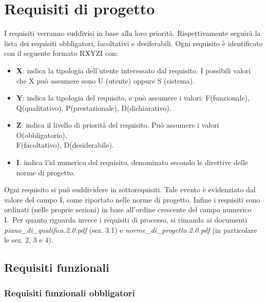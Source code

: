 \newpage\section{Requisiti di progetto}
I requisiti verranno suddivisi in base alla loro priorità. Rispettivamente seguirà la lista dei requisiti obbligatori, facoltativi e desiferabili. Ogni requisito è identificato con il seguente formato RXYZI con:


		\begin{itemize}

			\item \textbf{X}: indica la tipologia dell'utente interessato dal requisito. I possibili valori che X può assumere sono U (utente) oppure S (sistema).

			\item \textbf{Y}: indica la tipologia del requisito, e può assumere i valori: F(funzionale), Q(qualitativo), P(prestazionale), D(dichiarativo).

			\item \textbf{Z}: indica il livello di priorità del requisito. Può assumere i valori O(obbligatorio), \\F(facoltativo), D(desiderabile).

			\item \textbf{I}: indica l'id numerico del requisito, denominato secondo le direttive delle norme di progetto.

		\end{itemize}


		Ogni requisito si può suddividere in sottorequisiti. Tale evento è evidenziato dal valore del campo I, come riportato nelle norme di progetto. Infine i requisiti sono ordinati (nelle proprie sezioni) in base all'ordine crescente del campo numerico I.\
Per quanto riguarda invece i requisiti di processo, si rimanda ai documenti \textit{piano\_di\_qualifica.2.0.pdf} (sez. 3.1) e \textit{norme\_di\_progetto.2.0.pdf} (in particolare le sez. 2, 3 e 4).

\subsection{Requisiti funzionali}


\subsubsection{Requisiti funzionali obbligatori}

